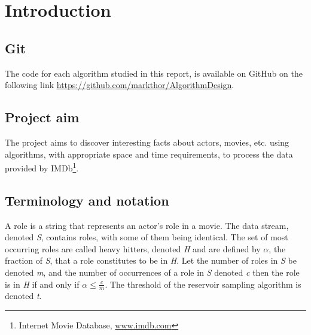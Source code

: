 
\section{Introduction}

\subsection{Git}
The code for each algorithm studied in this report, is available on GitHub on the following link \url{https://github.com/markthor/AlgorithmDesign}.

\subsection{Project aim}
The project aims to discover interesting facts about actors, movies, etc. using algorithms, with appropriate space and time requirements, to process the data provided by IMDb\footnote{Internet Movie Database, \url{www.imdb.com}}.

\subsection{Terminology and notation}
A role is a string that represents an actor’s role in a movie. The data stream, denoted \textit{S}, contains roles, with some of them being identical. The set of most occurring roles are called heavy hitters, denoted \textit{H} and are defined by \(\alpha\), the fraction of \textit{S}, that a role constitutes to be in \textit{H}.
Let the number of roles in \textit{S} be denoted \textit{m}, and the number of occurrences of a role in \textit{S} denoted \textit{c} then the role is in \textit{H} if and only if 
\begin{math}
	\alpha \le \frac{c}{m}
\end{math}. The threshold of the reservoir sampling algorithm is denoted \textit{t}.

